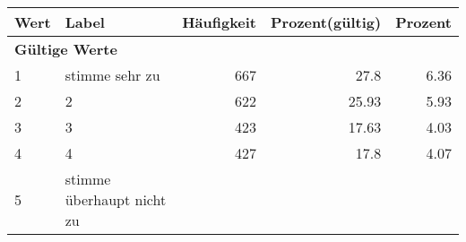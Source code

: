      \begin{longtable}{lXrrr}
     \toprule
     \textbf{Wert} & \textbf{Label} & \textbf{Häufigkeit} & \textbf{Prozent(gültig)} & \textbf{Prozent} \\
     \endhead
     \midrule
     \multicolumn{5}{l}{\textbf{Gültige Werte}}\\

     1 &
     \multicolumn{1}{X}{ stimme sehr zu   } &


       \num{667} &
       \num[round-mode=places,round-precision=2]{27,8} &
         \num[round-mode=places,round-precision=2]{6,36} \\

     2 &
     \multicolumn{1}{X}{ 2   } &


       \num{622} &
       \num[round-mode=places,round-precision=2]{25,93} &
         \num[round-mode=places,round-precision=2]{5,93} \\

     3 &
     \multicolumn{1}{X}{ 3   } &


       \num{423} &
       \num[round-mode=places,round-precision=2]{17,63} &
         \num[round-mode=places,round-precision=2]{4,03} \\

     4 &
     \multicolumn{1}{X}{ 4   } &


       \num{427} &
       \num[round-mode=places,round-precision=2]{17,8} &
         \num[round-mode=places,round-precision=2]{4,07} \\

     5 &
     \multicolumn{1}{X}{ stimme überhaupt nicht zu   } &



\end{longtable}

